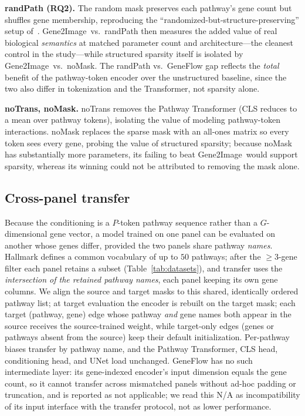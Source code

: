 \documentclass[journal]{IEEEtran}
\newcommand{\method}{Gene2Image}
\begin{document}
\textbf{randPath (RQ2).} The random mask preserves each pathway's gene count but
shuffles gene membership, reproducing the ``randomized-but-structure-preserving''
setup of~\cite{sparsity}. \method\ vs.\ randPath then measures the added value of
real biological \emph{semantics} at matched parameter count and architecture---the
cleanest control in the study---while structured sparsity itself is isolated by
\method\ vs.\ noMask. The randPath vs.\ GeneFlow gap reflects the \emph{total}
benefit of the pathway-token encoder over the unstructured baseline, since the two
also differ in tokenization and the Transformer, not sparsity alone.

\textbf{noTrans, noMask.} noTrans removes the Pathway Transformer (CLS reduces to
a mean over pathway tokens), isolating the value of modeling pathway-token
interactions. noMask replaces the sparse mask with an all-ones matrix so every
token sees every gene, probing the value of structured sparsity; because noMask
has substantially more parameters, its failing to beat \method\ would support
sparsity, whereas its winning could not be attributed to removing the mask alone.

\subsection{Cross-panel transfer}
Because the conditioning is a $P$-token pathway sequence rather than a
$G$-dimensional gene vector, a model trained on one panel can be evaluated on
another whose genes differ, provided the two panels share pathway \emph{names}.
Hallmark defines a common vocabulary of up to $50$ pathways; after the
$\geq 3$-gene filter each panel retains a subset (Table~\ref{tab:datasets}), and
transfer uses the \emph{intersection of the retained pathway names}, each panel
keeping its own gene columns. We align the source and target masks to this shared,
identically ordered pathway list; at target evaluation the encoder is rebuilt on
the target mask; each target (pathway, gene) edge whose pathway \emph{and} gene
names both appear in the source receives the source-trained weight, while
target-only edges (genes or pathways absent from the source) keep their default
initialization. Per-pathway biases transfer by pathway name, and the Pathway
Transformer, CLS head, conditioning head, and UNet load unchanged. GeneFlow has
no such intermediate layer: its gene-indexed encoder's input dimension equals the
gene count, so it cannot transfer across mismatched panels without ad-hoc padding
or truncation, and is reported as not applicable; we read this N/A as
incompatibility of its input interface with the transfer protocol, not as lower
performance.
\end{document}
